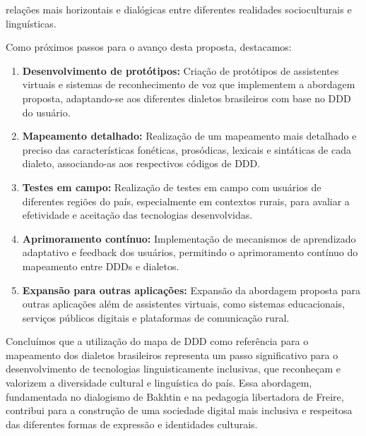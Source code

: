 relações mais horizontais e dialógicas entre diferentes realidades socioculturais e linguísticas.

Como próximos passos para o avanço desta proposta, destacamos:

\begin{enumerate}
    \item \textbf{Desenvolvimento de protótipos:} Criação de protótipos de assistentes virtuais e sistemas de reconhecimento de voz que implementem a abordagem proposta, adaptando-se aos diferentes dialetos brasileiros com base no DDD do usuário.
    \item \textbf{Mapeamento detalhado: }Realização de um mapeamento mais detalhado e preciso das características fonéticas, prosódicas, lexicais e sintáticas de cada dialeto, associando-as aos respectivos códigos de DDD.
    \item \textbf{Testes em campo:} Realização de testes em campo com usuários de diferentes regiões do país, especialmente em contextos rurais, para avaliar a efetividade e aceitação das tecnologias desenvolvidas.
    \item \textbf{Aprimoramento contínuo:} Implementação de mecanismos de aprendizado adaptativo e feedback dos usuários, permitindo o aprimoramento contínuo do mapeamento entre DDDs e dialetos.
    \item \textbf{Expansão para outras aplicações:} Expansão da abordagem proposta para outras aplicações além de assistentes virtuais, como sistemas educacionais, serviços públicos digitais e plataformas de comunicação rural.
\end{enumerate}

Concluímos que a utilização do mapa de DDD como referência para o mapeamento dos dialetos brasileiros representa um passo significativo para o desenvolvimento de tecnologias linguisticamente inclusivas, que reconheçam e valorizem a diversidade cultural e linguística do país. Essa abordagem, fundamentada no dialogismo de Bakhtin e na pedagogia libertadora de Freire, contribui para a construção de uma sociedade digital mais inclusiva e respeitosa das diferentes formas de expressão e identidades culturais.
